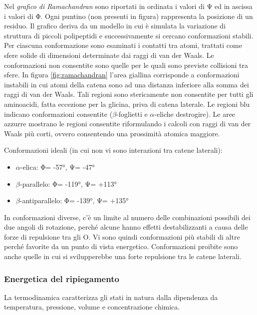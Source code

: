 {{{Nel \textit{grafico di Ramachandran} sono riportati in ordinata i valori di Ψ ed in ascissa i valori di Φ. Ogni puntino (non presenti in figura) rappresenta la posizione di un residuo. Il grafico deriva da un modello in cui è simulata la variazione di struttura di piccoli polipeptidi e successivamente si cercano conformazioni stabili. Per ciascuna conformazione sono esaminati i contatti tra atomi, trattati come sfere solide di dimensioni determinate dai raggi di van der Waals. Le conformazioni non consentite sono quelle per le quali sono previste collisioni tra sfere. In figura \ref{fig:ramachandran} l'area giallina corrisponde a conformazioni instabili in cui atomi della catena sono ad una distanza inferiore alla somma dei raggi di van der Waals. Tali regioni sono stericamente non consentite per tutti gli aminoacidi, fatta eccezione per la glicina, priva di catena laterale. Le regioni blu indicano conformazioni consentite ($\beta$-foglietti e $\alpha$-eliche destrogire). Le aree azzurre mostrano le regioni consentite riformulando i calcoli con raggi di van der Waals più corti, ovvero consentendo una prossimità atomica maggiore.

\par Conformazioni ideali (in cui non vi sono interazioni tra catene laterali):
\begin{itemize}
	\item $\alpha$-elica: Φ= -57°, Ψ= -47°
	\item $\beta$-parallelo: Φ= -119°, Ψ= +113°
	\item $\beta$-antiparallelo: Φ= -139°, Ψ= +135°
\end{itemize}

\par In conformazioni diverse, c’è un limite al numero delle combinazioni
possibili dei due angoli di rotazione, perché alcune hanno effetti
destabilizzanti a causa delle forze di repulsione tra gli O. Vi sono quindi conformazioni più stabili di altre perché favorite da un
punto di vista energetico. Conformazioni proibite sono anche quelle in cui si svilupperebbe una forte repulsione tra le catene laterali.
}

\subsubsection{Energetica del ripiegamento} \label{sec:energetica}
La termodinamica caratterizza gli stati in natura dalla dipendenza da temperatura, pressione, volume e concentrazione chimica. 

}}
